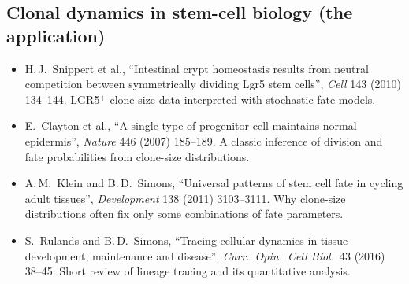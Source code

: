 \documentclass[11pt]{article}
\theoremstyle{definition}
\theoremstyle{remark}
\begin{document}
\subsection*{Clonal dynamics in stem-cell biology (the application)}
\begin{itemize}
\item[C1$^\star$] H.\,J.\ Snippert et al., ``Intestinal crypt homeostasis results from neutral competition between symmetrically dividing Lgr5 stem cells'', \emph{Cell} 143 (2010) 134--144. LGR5$^+$ clone-size data interpreted with stochastic fate models.
\item[C2] E.\ Clayton et al., ``A single type of progenitor cell maintains normal epidermis'', \emph{Nature} 446 (2007) 185--189. A classic inference of division and fate probabilities from clone-size distributions.
\item[C3] A.\,M.\ Klein and B.\,D.\ Simons, ``Universal patterns of stem cell fate in cycling adult tissues'', \emph{Development} 138 (2011) 3103--3111. Why clone-size distributions often fix only some combinations of fate parameters.
\item[C4] S.\ Rulands and B.\,D.\ Simons, ``Tracing cellular dynamics in tissue development, maintenance and disease'', \emph{Curr.\ Opin.\ Cell Biol.}\ 43 (2016) 38--45. Short review of lineage tracing and its quantitative analysis.
\end{itemize}
\end{document}
